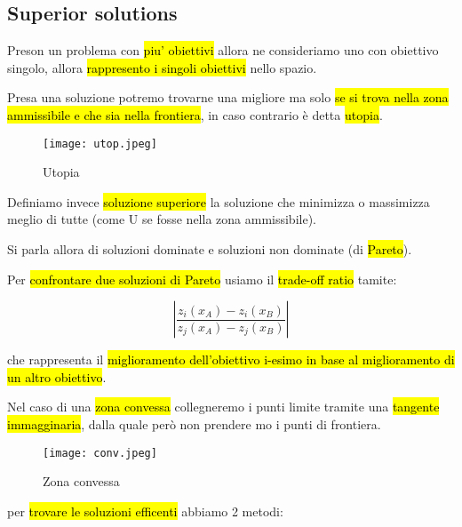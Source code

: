 \subsection{Superior solutions}

Preson un problema con \hl{piu' obiettivi} allora ne consideriamo uno con obiettivo singolo, allora \hl{rappresento i singoli obiettivi} nello spazio.

Presa una soluzione potremo trovarne una migliore ma solo \hl{se si trova nella zona ammissibile e che sia nella frontiera}, in caso contrario è detta \hl{utopia}.

\begin{figure}[H]
\centering
\texttt{[image: utop.jpeg]}
\caption{Utopia} 
\label{utop}
\end{figure}

Definiamo invece \hl{soluzione superiore} la soluzione che minimizza o massimizza meglio di tutte (come U se fosse nella zona ammissibile).

Si parla allora di soluzioni dominate e soluzioni non dominate (di \hl{Pareto}).

Per \hl{confrontare due soluzioni di Pareto} usiamo il \hl{trade-off ratio} tamite:

$$|\frac{z_i(x_A)-z_i(x_B)}{z_j(x_A)-z_j(x_B)}|$$

che rappresenta il \hl{miglioramento dell'obiettivo i-esimo in base al miglioramento di un altro obiettivo}.

Nel caso di una \hl{zona convessa} collegneremo i punti limite tramite una \hl{tangente immagginaria}, dalla quale però non prendere mo i punti di frontiera.

\begin{figure}[H]
\centering
\texttt{[image: conv.jpeg]}
\caption{Zona convessa} 
\label{conv}
\end{figure}

per \hl{trovare le soluzioni efficenti} abbiamo 2 metodi:


